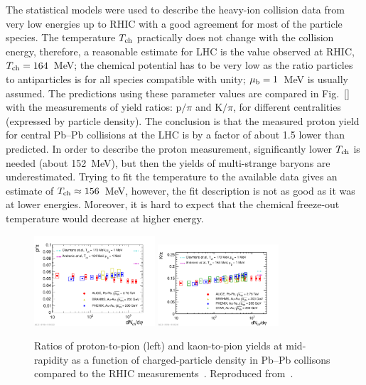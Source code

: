 The statistical models were used to describe the heavy-ion collision data from very low energies up to RHIC with a good agreement for most of the particle species. The temperature $T_{\rm ch}$ practically does not change with the collision energy, therefore, a reasonable estimate for LHC is the value observed at RHIC, $T_{\rm ch} = 164$~MeV; the chemical potential has to be very low as the ratio particles to antiparticles is for all species compatible with unity; $\mu_{\rm b} = 1$~MeV is usually assumed. The predictions using these parameter values are compared in Fig.~\ref{} with the measurements of yield ratios: p$/\pi$ and K$/\pi$, for different centralities (expressed by particle density). The conclusion is that the measured proton yield for central Pb--Pb collisions at the LHC is by a factor of about 1.5 lower than predicted. In order to describe the proton measurement, significantly lower $T_{\rm ch}$ is needed (about 152~MeV), but then the yields of multi-strange baryons are underestimated. Trying to fit the temperature to the available data gives an estimate of $T_{\rm ch} \approx 156$~MeV, however, the fit description is not as good as it was at lower energies. Moreover, it is hard to expect that the chemical freeze-out temperature would decrease at higher energy.

\begin{figure}
\centering
\includegraphics[width=0.4\textwidth]{ksfigures/YieldProtonToPion.pdf}
\includegraphics[width=0.4\textwidth]{ksfigures/YieldKaonToPion.pdf}
\caption{Ratios of proton-to-pion (left) and kaon-to-pion yields at mid-rapidity as a function of charged-particle density in Pb--Pb collisons compared to the RHIC measurements~\cite{Abelev:2008ab,Bearden:2001qq,Adler:2003cb}. Reproduced from~\cite{Abelev:2013vea}.}
\label{figks:StrageEnhancement}
\end{figure}


